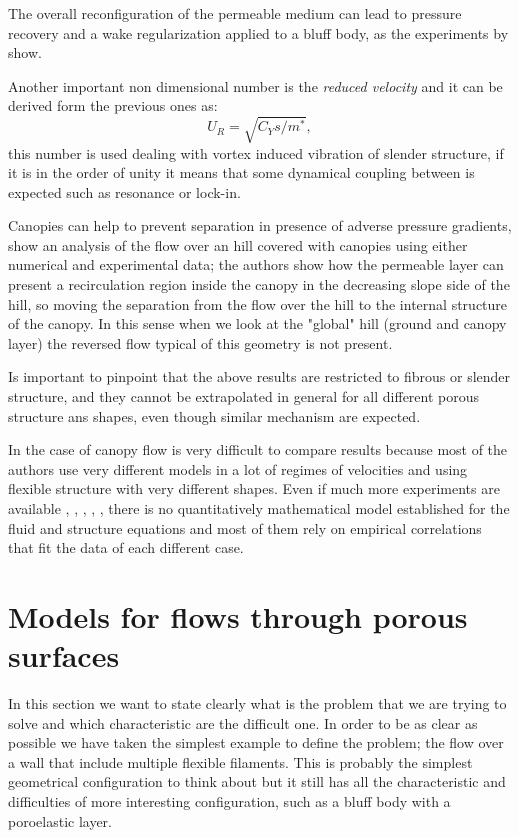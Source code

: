 The overall reconfiguration of the permeable medium can lead to pressure recovery and a wake regularization applied to a bluff body, as the experiments by \citet{gosselin2011drag} show.

Another important non dimensional number is the \textit{reduced velocity} and it can be derived form the previous ones as:
$$ U_R = \sqrt{C_Y s / m^*},$$
this number is used dealing with vortex induced vibration of slender structure, if it is in the order of unity it means that some dynamical coupling between is expected such as resonance or lock-in.

Canopies can help to prevent separation in presence of adverse pressure gradients, \citet{belcher2012wind} show an analysis of the flow over an hill covered with canopies using either numerical and experimental data; the authors show how the permeable layer can present a recirculation region inside the canopy in the decreasing slope side of the hill, so moving the separation from the flow over the hill to the internal structure of the canopy.
In this sense when we look at the "global" hill (ground and canopy layer) the reversed flow typical of this geometry is not present.

Is important to pinpoint that the above results are restricted to fibrous or slender structure, and they cannot be extrapolated in general for all different porous structure ans shapes, even though similar mechanism are expected.

In the case of canopy flow is very difficult to compare results because most of the authors use very different models in a lot of regimes of velocities and using flexible structure with very different shapes.
Even if much more experiments are available \citet{segalini2011experimental}, \citet{segalini2013scaling}, \citet{maza2013coupled}, \citet{barsu2016drag}, \citet{alvarado2017nature}, there is no quantitatively mathematical model established for the fluid and structure equations and most of them rely on empirical correlations that fit the data of each different case.


\section{Models for flows through porous surfaces}

In this section we want to state clearly what is the problem that we are trying to solve and which characteristic are the difficult one.
In order to be as clear as possible we have taken the simplest example to define the problem; the flow over a wall that include multiple flexible filaments. 
This is probably the simplest geometrical configuration to think about but it still has all the characteristic and difficulties of more interesting configuration, such as a bluff body with a poroelastic layer.

